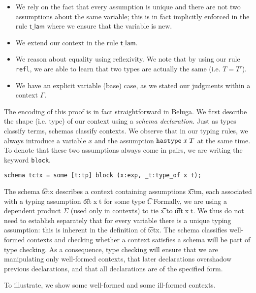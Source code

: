 \begin{itemize}
\item We rely on the fact that every assumption is unique and there
  are not two assumptions about the same variable; this is in fact
  implicitly enforced in the rule $\textsf{t\_lam}$ where we ensure
  that the variable is new.
\item We extend our context in the rule $\textsf{t\_lam}$.
\item We reason about equality using reflexivity. We note that by
  using our rule \lstinline!refl!, we are able to learn that two types
  are actually the same (i.e. $T = T'$).
\item We have an explicit variable (base) case, as we stated our judgments
  within a context $\Gamma$.
\end{itemize}


The encoding of this proof is in fact straightforward in Beluga. We
first describe the shape (i.e. type) of our context using a
\emph{schema declaration}. Just as types classify terms, schemas
classify contexts. We observe that in our typing rules, we always
introduce a variable $x$ and the assumption $\mathtt{hastype}\; x\;T$ at the same
time.
To denote that these two assumptions always come in pairs, we are
writing the keyword \lstinline!block!. 

\begin{lstlisting}
schema tctx = some [t:tp] block (x:exp, _t:type_of x t);  
\end{lstlisting}

The schema \t{tctx} describes a context containing assumptions
\t{x:tm}, each associated with a typing assumption \t{oft$\;$x$\;$t}
for some type \t{t}.  Formally, we are using a dependent product $\Sigma$
(used only in contexts) to tie \t{x} to \t{oft$\;$x$\;$t}. 
We thus do not need to establish separately that for every variable there is a
unique typing assumption: this is inherent in the definition of \t{tctx}.
The schema classifies well-formed contexts and checking whether a
context satisfies a schema will be part of type checking. As a
consequence, type checking will ensure that we are manipulating only
well-formed contexts, that later declarations overshadow previous
declarations, and that all declarations are of the specified form.

To illustrate, we show some well-formed  and some ill-formed
contexts.

